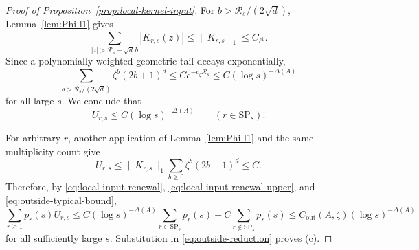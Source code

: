 \documentclass[letterpaper,11pt,reqno]{amsart}
\theoremstyle{definition}
\begin{document}
\begin{proof}[Proof of Proposition~\ref{prop:local-kernel-input}]
For \(b>\mathcal R_s/(2\sqrt d)\), Lemma~\ref{lem:Phi-l1} gives
\[
\sum_{|z|>\mathcal R_s-\sqrt d\,b}|K_{r,s}(z)|
\le
\|K_{r,s}\|_1\le C_{\ell^1}.
\]
Since a polynomially weighted geometric tail decays exponentially,
\[
\sum_{b>\mathcal R_s/(2\sqrt d)}\zeta^b(2b+1)^d
\le
Ce^{-c_\zeta\mathcal R_s}
\le
C(\log s)^{-\Delta(A)}
\]
for all large \(s\). We conclude that
\begin{equation}\label{eq:outside-typical-bound}
U_{r,s}\le C(\log s)^{-\Delta(A)}
\qquad (r\in\mathrm{SP}_s).
\end{equation}

For arbitrary \(r\), another application of Lemma~\ref{lem:Phi-l1} and the same
multiplicity count give
\[
U_{r,s}
\le
\|K_{r,s}\|_1\sum_{b\ge0}\zeta^b(2b+1)^d
\le C.
\]
Therefore, by \eqref{eq:local-input-renewal},
\eqref{eq:local-input-renewal-upper}, and \eqref{eq:outside-typical-bound},
\[
\sum_{r\ge1}p_r(s)U_{r,s}
\le
C(\log s)^{-\Delta(A)}
\sum_{r\in\mathrm{SP}_s}p_r(s)
+C\sum_{r\notin\mathrm{SP}_s}p_r(s)
\le
C_{\mathrm{out}}(A,\zeta)(\log s)^{-\Delta(A)}
\]
for all sufficiently large \(s\). Substitution in \eqref{eq:outside-reduction} proves (c).
\end{proof}



\end{document}
